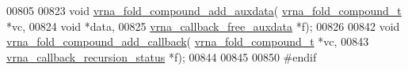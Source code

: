 \begin{DoxyCode}
00805 
00823 \textcolor{keywordtype}{void} \hyperlink{group__fold__compound_ga6316a9426bea2f742375e8df6febd3f6}{vrna\_fold\_compound\_add\_auxdata}(
      \hyperlink{group__fold__compound_structvrna__fc__s}{vrna\_fold\_compound\_t} *vc,
00824                                     \textcolor{keywordtype}{void} *data,
00825                                     \hyperlink{group__fold__compound_ga3ae51bfd5fc3236652d1de4e3274b49b}{vrna\_callback\_free\_auxdata} *f);
00826 
00842 \textcolor{keywordtype}{void} \hyperlink{group__fold__compound_ga097ed6133055624667cbce8cfdebf82d}{vrna\_fold\_compound\_add\_callback}( 
      \hyperlink{group__fold__compound_structvrna__fc__s}{vrna\_fold\_compound\_t} *vc,
00843                                       \hyperlink{group__fold__compound_ga4a4a0d838de6d18315bafc84f93f5cc0}{vrna\_callback\_recursion\_status} *f);
00844 
00845 
00850 \textcolor{preprocessor}{#endif}
\end{DoxyCode}
